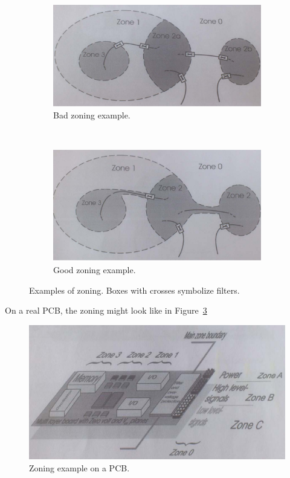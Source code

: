 \begin{figure}[H]
    \centering
    \begin{subfigure}[b]{0.5\textwidth}
        \includegraphics[width=\textwidth]{./figures/FIG_badzone.png}
        \caption{Bad zoning example.}
        \label{fig:badzone}
    \end{subfigure}
    ~
    \begin{subfigure}[b]{0.5\textwidth}
        \includegraphics[width=\textwidth]{./figures/FIG_goodzone.png}
        \caption{Good zoning example.}
    \end{subfigure}
    \caption{Examples of zoning. Boxes with crosses symbolize filters.}
    \label{fig:zones}
\end{figure}
On a real PCB, the zoning might look like in Figure~\ref{fig:pcbzoning}
\begin{figure}[H]
    \centering
    \includegraphics[width=\textwidth]{./figures/FIG_pcbzoning.png}
    \caption{Zoning example on a PCB.}
    \label{fig:pcbzoning}
\end{figure}






